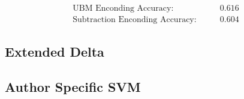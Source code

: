 \begin{align}
\text{UBM Enconding Accuracy}:&\qquad 0.616\\
\text{Subtraction Enconding Accuracy}:& \qquad 0.604
\end{align}

\subsection{Extended Delta}

\subsection{Author Specific SVM}
